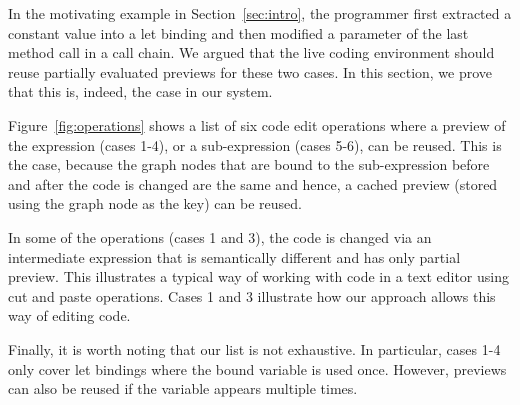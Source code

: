 \documentclass[acmsmall,anonymous,fleqn]{acmart}\settopmatter{printfolios=false,printccs=false,printacmref=false}
\theoremstyle{plain}
\theoremstyle{definition}
\begin{document}
In the motivating example in Section~\ref{sec:intro}, the programmer first extracted a constant
value into a let binding and then modified a parameter of the last method call in a call chain.
We argued that the live coding environment should reuse partially evaluated previews for these
two cases. In this section, we prove that this is, indeed, the case in our system.

Figure~\ref{fig:operations} shows a list of six code edit operations where a preview of the
expression (cases 1-4), or a sub-expression (cases 5-6), can be reused. This is the case, because
the graph nodes that are bound to the sub-expression before and after the code is changed are the
same and hence, a cached preview (stored using the graph node as the key) can be reused.

In some of the operations (cases 1 and 3), the code is changed via an intermediate expression
that is semantically different and has only partial preview. This illustrates a typical way of
working with code in a text editor using cut and paste operations. Cases 1 and 3 illustrate how
our approach allows this way of editing code.

Finally, it is worth noting that our list is not exhaustive. In particular, cases 1-4 only cover
let bindings where the bound variable is used once. However, previews can also be reused if the
variable appears multiple times.

\end{document}
